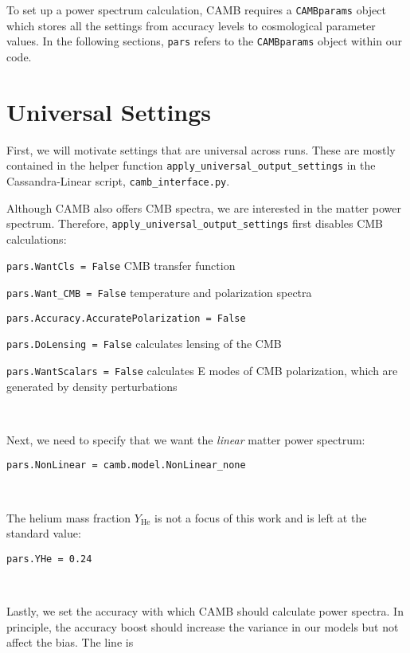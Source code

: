 
To set up a power spectrum calculation, CAMB requires a
\verb|CAMBparams| object which stores all the settings from accuracy levels
to cosmological parameter values. In the following sections, \verb|pars| 
refers to the \verb|CAMBparams| object within our code.

\section{Universal Settings}

First, we will motivate settings that are universal across runs. These are 
mostly 
contained in the helper function \verb|apply_universal_output_settings| in the 
Cassandra-Linear script, \verb|camb_interface.py|.

Although CAMB also offers CMB spectra, we are interested in the
matter power spectrum. Therefore, \verb|apply_universal_output_settings|  
first disables CMB calculations:

\verb|pars.WantCls = False| \quad CMB transfer function

\verb|pars.Want_CMB = False| \quad temperature and polarization spectra

\verb|pars.Accuracy.AccuratePolarization = False|

\verb|pars.DoLensing = False| \quad calculates lensing of the CMB

\verb|pars.WantScalars = False| \quad calculates E modes of CMB polarization, 
which are generated by density perturbations 

\

Next, we need to specify that we want the \textit{linear} matter power 
spectrum:

\verb|pars.NonLinear = camb.model.NonLinear_none|


\

The helium mass fraction $Y_\text{He}$ is not a focus of this work and is left
at the standard value:

\verb|pars.YHe = 0.24| \quad {}

\

Lastly, we set the accuracy with which CAMB should calculate power spectra.
In principle, the accuracy boost should increase the variance in our models but not affect the bias. The line is

